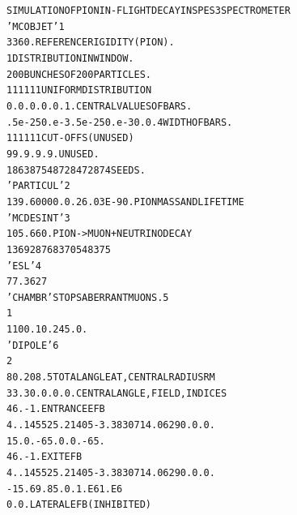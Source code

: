 \footnotesize
\begin{alltt}
  SIMULATION  OF  PION  IN-FLIGHT  DECAY  IN  SPES3  SPECTROMETER
  'MCOBJET'                                                              1      
  3360.                                REFERENCE  RIGIDITY (PION).              
  1                                    DISTRIBUTION  IN  WINDOW.                
  200                                  BUNCHES  OF  200  PARTICLES.             
  1     1       1     1      1    1    UNIFORM DISTRIBUTION                     
  0.    0.      0.    0.     0.   1.   CENTRAL  VALUES  OF  BARS.               
  .5e-2 50.e-3 .5e-2  50.e-3 0.  0.4   WIDTH  OF  BARS.                         
  1     1       1     1      1    1    CUT-OFFS (UNUSED)                        
  9   9. 9. 9. 9.                      UNUSED.                                  
  186387 548728 472874                 SEEDS.                                   
  'PARTICUL'                                                             2      
  139.6000 0. 0. 26.03E-9 0.           PION MASS AND LIFE TIME                  
  'MCDESINT'                                                             3      
  105.66   0.                          PION -> MUON + NEUTRINODECAY             
  136928 768370 548375                                                          
  'ESL'                                                                  4      
  77.3627                                                                       
  'CHAMBR'                             STOPS  ABERRANT  MUONS.           5      
  1                                                                             
  1   100. 10. 245.  0.                                                         
  'DIPOLE'                                                               6      
  2                                                                   
  80.   208.5                          TOTAL ANGLE AT, CENTRAL RADIUS RM
  33.   30. 0. 0. 0.                   CENTRAL ANGLE, FIELD, INDICES
  46. -1.                              ENTRANCE EFB            
  4. .14552 5.21405 -3.38307 14.0629 0. 0. 0.                                   
   15.   0.      -65.  0.    0.  -65.                                           
  46. -1.                              EXIT EFB                             
  4. .14552 5.21405 -3.38307 14.0629 0. 0. 0.                                   
  -15.  69.       85.  0.    1.E6  1.E6                                         
  0. 0.                                LATERAL EFB (INHIBITED)  

\end{alltt}

